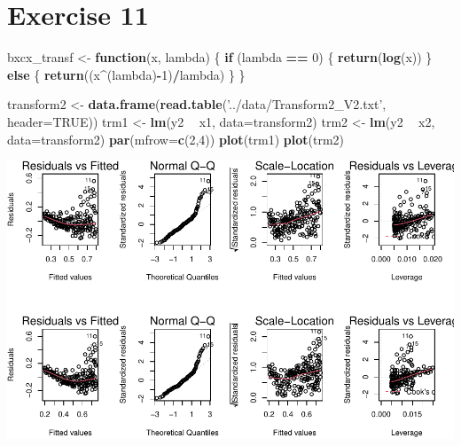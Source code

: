 \documentclass[]{article}
\newenvironment{Shaded}{\begin{snugshade}}{\end{snugshade}}
\newcommand{\ControlFlowTok}[1]{\textcolor[rgb]{0.13,0.29,0.53}{\textbf{#1}}}
\newcommand{\DataTypeTok}[1]{\textcolor[rgb]{0.13,0.29,0.53}{#1}}
\newcommand{\DecValTok}[1]{\textcolor[rgb]{0.00,0.00,0.81}{#1}}
\newcommand{\KeywordTok}[1]{\textcolor[rgb]{0.13,0.29,0.53}{\textbf{#1}}}
\newcommand{\NormalTok}[1]{#1}
\newcommand{\OperatorTok}[1]{\textcolor[rgb]{0.81,0.36,0.00}{\textbf{#1}}}
\newcommand{\OtherTok}[1]{\textcolor[rgb]{0.56,0.35,0.01}{#1}}
\newcommand{\StringTok}[1]{\textcolor[rgb]{0.31,0.60,0.02}{#1}}
\begin{document}
\hypertarget{exercise-11}{%
\section{Exercise 11}\label{exercise-11}}

\begin{Shaded}
\begin{Highlighting}[]
\NormalTok{bxcx_transf <-}\StringTok{ }\ControlFlowTok{function}\NormalTok{(x, lambda) \{}
    \ControlFlowTok{if}\NormalTok{ (lambda }\OperatorTok{==}\StringTok{ }\DecValTok{0}\NormalTok{) \{}
        \KeywordTok{return}\NormalTok{(}\KeywordTok{log}\NormalTok{(x))}
\NormalTok{    \} }\ControlFlowTok{else}\NormalTok{ \{}
        \KeywordTok{return}\NormalTok{((x}\OperatorTok{^}\NormalTok{(lambda)}\OperatorTok{-}\DecValTok{1}\NormalTok{)}\OperatorTok{/}\NormalTok{lambda)}
\NormalTok{    \}}
\NormalTok{\}}
\end{Highlighting}
\end{Shaded}

\begin{Shaded}
\begin{Highlighting}[]
\NormalTok{transform2 <-}\StringTok{ }\KeywordTok{data.frame}\NormalTok{(}\KeywordTok{read.table}\NormalTok{(}\StringTok{'../data/Transform2_V2.txt'}\NormalTok{, }\DataTypeTok{header=}\OtherTok{TRUE}\NormalTok{))}
\NormalTok{trm1 <-}\StringTok{ }\KeywordTok{lm}\NormalTok{(y2 }\OperatorTok{~}\StringTok{ }\NormalTok{x1, }\DataTypeTok{data=}\NormalTok{transform2)}
\NormalTok{trm2 <-}\StringTok{ }\KeywordTok{lm}\NormalTok{(y2 }\OperatorTok{~}\StringTok{ }\NormalTok{x2, }\DataTypeTok{data=}\NormalTok{transform2)}
\KeywordTok{par}\NormalTok{(}\DataTypeTok{mfrow=}\KeywordTok{c}\NormalTok{(}\DecValTok{2}\NormalTok{,}\DecValTok{4}\NormalTok{))}
\KeywordTok{plot}\NormalTok{(trm1)}
\KeywordTok{plot}\NormalTok{(trm2)}
\end{Highlighting}
\end{Shaded}

\includegraphics{./figures/unnamed-chunk-32-1.pdf}
\end{document}
